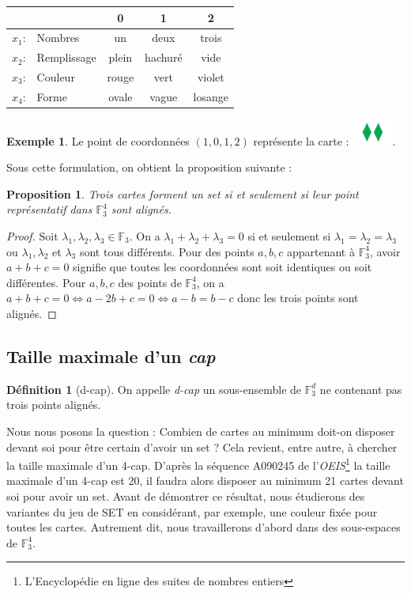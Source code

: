 \documentclass[a4paper,12pt,titlepage]{article}
\theoremstyle{plain}
\newtheorem{prop}{Proposition}
\theoremstyle{definition}
\newtheorem{defi}{Définition}
\newtheorem{ex}{Exemple}
\newcommand{\Ftrois}[1]{\mathbb{F}^#1_3}
\begin{document}
\begin{center}
\begin{tabular}{r l | c c c }
 & & 0 & 1 & 2 \\
\hline
$x_1$: & Nombres     & un		& deux	  & trois 	\\
$x_2$: & Remplissage & plein 	& hachuré & vide 	\\
$x_3$: & Couleur     & rouge	& vert	  & violet 	\\
$x_4$: & Forme       & ovale	& vague	  & losange \\
\end{tabular}
\end{center}

\begin{ex}
Le point de coordonnées $(1,0,1,2)$ représente la carte : \includegraphics[width=0.1\textwidth]{Img/1012.png}.
\end{ex}

\noindent Sous cette formulation, on obtient la proposition suivante :
\begin{prop}
Trois cartes forment un set si et seulement si leur point représentatif dans  $\Ftrois{4}$ sont alignés.
\end{prop}
\begin{proof}
Soit $\lambda_1,\lambda_2,\lambda_3 \in \mathbb{F}_3$. On a $\lambda_1 + \lambda_2 + \lambda_3 = 0$ si et seulement si $\lambda_1=\lambda_2=\lambda_3$ ou $\lambda_1,\lambda_2$ et $\lambda_3$ sont tous différents. Pour des points $a,b,c$ appartenant à  $\Ftrois{4}$, avoir $a+b+c=0$ signifie que toutes les coordonnées sont soit identiques ou soit différentes.
Pour $a,b,c$ des points de  $\Ftrois{4}$, on a $a+b+c=0 \iff a-2b+c=0 \iff a-b=b-c$ donc les trois points sont alignés.
\end{proof}


\subsection{Taille maximale d'un \emph{cap}}
\begin{defi}[d-cap]
On appelle \emph{d-cap} un sous-ensemble de  $\Ftrois{d}$ ne contenant pas trois points alignés.
\end{defi}
Nous nous posons la question : Combien de cartes au minimum doit-on disposer devant soi pour être certain d'avoir un set ?
Cela revient, entre autre, à chercher la taille maximale d'un 4-cap. D'après la séquence A090245 de l'\emph{OEIS}\footnote{L'Encyclopédie en ligne des suites de nombres entiers} la taille maximale d'un 4-cap est 20, il faudra alors disposer au minimum 21 cartes devant soi pour avoir un set.
Avant de démontrer ce résultat, nous étudierons des variantes du jeu de SET en considérant, par exemple, une couleur fixée pour toutes les cartes. Autrement dit, nous travaillerons d'abord dans des sous-espaces de  $\Ftrois{4}$.
\end{document}
